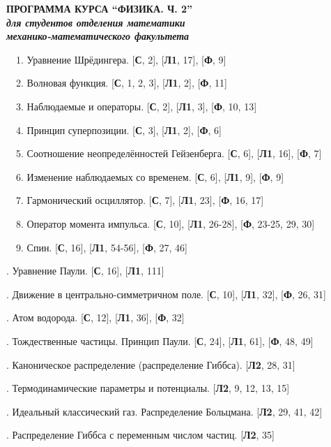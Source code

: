\documentclass[a4paper,12pt]{article}
\begin{document}
\begin{center}
\large{\textbf{ПРОГРАММА КУРСА ``ФИЗИКА. Ч. 2'' \\ \textit{для
студентов отделения математики\\ механико-математического
факультета}}}
\end{center}

\bigskip

\noindent ~~1. Уравнение Шрёдингера. [\textbf{С}, 2],
[\textbf{Л1}, 17], [\textbf{Ф}, 9]

\noindent ~~2. Волновая функция. [\textbf{С}, 1, 2, 3],
[\textbf{Л1}, 2], [\textbf{Ф}, 11]

\noindent ~~3. Наблюдаемые и операторы. [\textbf{С}, 2],
[\textbf{Л1}, 3], [\textbf{Ф}, 10, 13]

\noindent ~~4. Принцип суперпозиции. [\textbf{С}, 3],
[\textbf{Л1}, 2], [\textbf{Ф}, 6]


\noindent ~~5. Соотношение неопределённостей Гейзенберга.
[\textbf{С}, 6], [\textbf{Л1}, 16], [\textbf{Ф}, 7]

\noindent ~~6.  Изменение наблюдаемых со временем. [\textbf{С},
6], [\textbf{Л1}, 9], [\textbf{Ф}, 9]

\noindent ~~7. Гармонический осциллятор. [\textbf{С}, 7],
[\textbf{Л1}, 23], [\textbf{Ф}, 16, 17]

\noindent ~~8. Оператор момента импульса. [\textbf{С}, 10],
[\textbf{Л1}, 26-28], [\textbf{Ф}, 23-25, 29, 30]

\noindent ~~9. Спин. [\textbf{С}, 16], [\textbf{Л1}, 54-56],
[\textbf{Ф}, 27, 46]


. Уравнение Паули. [\textbf{С}, 16], [\textbf{Л1},
111]

. Движение в центрально-симметричном поле.
[\textbf{С}, 10], [\textbf{Л1}, 32], [\textbf{Ф}, 26, 31]

. Атом водорода. [\textbf{С}, 12], [\textbf{Л1}, 36],
[\textbf{Ф}, 32]


. Тождественные частицы. Принцип Паули. [\textbf{С},
24], [\textbf{Л1}, 61], [\textbf{Ф}, 48, 49]

. Каноническое распределение (распределение Гиббса).
[\textbf{Л2}, 28, 31]


. Термодинамические параметры и потенциалы.
[\textbf{Л2}, 9, 12, 13, 15]


. Идеальный классический газ. Распределение Больцмана.
[\textbf{Л2}, 29, 41, 42]

. Распределение Гиббса с переменным числом частиц.
[\textbf{Л2}, 35]
\end{document}
